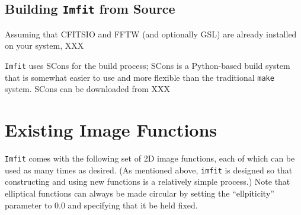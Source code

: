 \documentclass[10pt]{article}
\newcommand{\imfit}{\texttt{imfit}}
\newcommand{\Imfit}{\texttt{Imfit}}
\begin{document}
\subsection{Building \Imfit{} from Source}

Assuming that CFITSIO and FFTW (and optionally GSL) are already installed
on your system, XXX

\Imfit{} uses SCons for the build process; SCons is a Python-based build system
that is somewhat easier to use and more flexible than the traditional \texttt{make}
system. SCons can be downloaded from XXX


\section{Existing Image Functions}

\Imfit{} comes with the following set of 2D image functions, each of
which can be used as many times as desired. (As mentioned above, \imfit{}
is designed so that constructing and using new functions is a relatively
simple process.) Note that elliptical functions can always be made circular
by setting the ``ellpiticity'' parameter to 0.0 and specifying that it be
held fixed.
\end{document}
